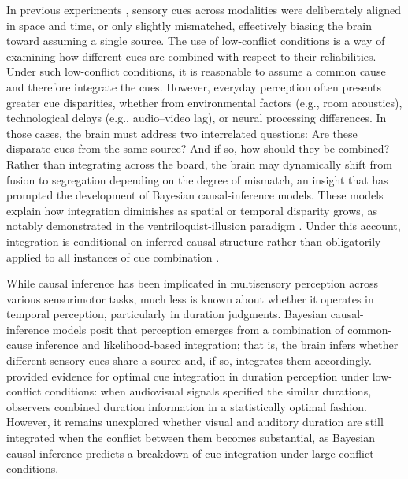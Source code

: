 \documentclass{jov}
\providecommand{\citep}[1]{\cite{#1}}
\begin{document}
In previous experiments \citep{shams2005sound,hartcher2014duration}, sensory cues across modalities were deliberately aligned in space and time, or only slightly mismatched, effectively biasing the brain toward assuming a single source. The use of low-conflict conditions is a way of examining how different cues are combined with respect to their reliabilities. Under such low-conflict conditions, it is reasonable to assume a common cause and therefore integrate the cues. However, everyday perception often presents greater cue disparities, whether from environmental factors (e.g., room acoustics), technological delays (e.g., audio--video lag), or neural processing differences. In those cases, the brain must address two interrelated questions: Are these disparate cues from the same source? And if so, how should they be combined? Rather than integrating across the board, the brain may dynamically shift from fusion to segregation depending on the degree of mismatch, an insight that has prompted the development of Bayesian causal-inference models. These models explain how integration diminishes as spatial or temporal disparity grows, as notably demonstrated in the ventriloquist-illusion paradigm \citep{shams2005sound,kording2007causal,hong2021causal}. Under this account, integration is conditional on inferred causal structure rather than obligatorily applied to all instances of cue combination \citep{kording2007causal,badde2018vision, badde2021causal,hong2021causal, badde2023multisensory, li2025precision}. 


While causal inference has been implicated in multisensory perception across various sensorimotor tasks, much less is known about whether it operates in temporal perception, particularly in duration judgments.  Bayesian causal-inference models posit that perception emerges from a combination of common-cause inference and likelihood-based integration; that is, the brain infers whether different sensory cues share a source and, if so, integrates them accordingly. \cite{hartcher2014duration} provided evidence for optimal cue integration in duration perception under low-conflict conditions: when audiovisual signals specified the similar durations, observers combined duration information in a statistically optimal fashion. However, it remains unexplored whether visual and auditory duration are still integrated when the conflict between them becomes substantial, as Bayesian causal inference predicts a breakdown of cue integration under large-conflict conditions. 
\end{document}
